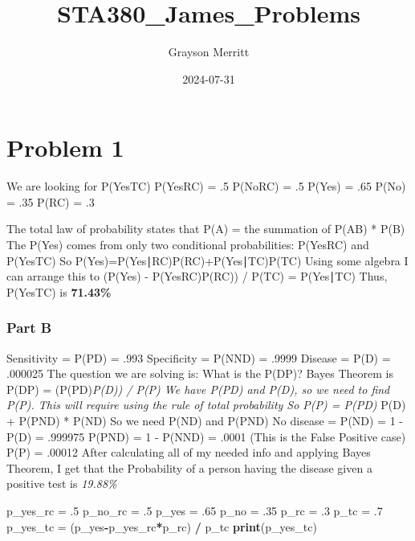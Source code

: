 \documentclass[
]{article}
\title{STA380\_James\_Problems}
\author{Grayson Merritt}
\date{2024-07-31}
\newenvironment{Shaded}{\begin{snugshade}}{\end{snugshade}}
\newcommand{\DecValTok}[1]{\textcolor[rgb]{0.00,0.00,0.81}{#1}}
\newcommand{\FunctionTok}[1]{\textcolor[rgb]{0.13,0.29,0.53}{\textbf{#1}}}
\newcommand{\NormalTok}[1]{#1}
\newcommand{\OtherTok}[1]{\textcolor[rgb]{0.56,0.35,0.01}{#1}}
\newcommand{\SpecialCharTok}[1]{\textcolor[rgb]{0.81,0.36,0.00}{\textbf{#1}}}
\begin{document}
\maketitle

\section{Problem 1}\label{problem-1}

We are looking for P(Yes\textbar TC) P(Yes\textbar RC) = .5
P(No\textbar RC) = .5 P(Yes) = .65 P(No) = .35 P(RC) = .3

The total law of probability states that P(A) = the summation of
P(A\textbar B) * P(B) The P(Yes) comes from only two conditional
probabilities: P(Yes\textbar RC) and P(Yes\textbar TC) So
P(Yes)=P(Yes∣RC)P(RC)+P(Yes∣TC)P(TC) Using some algebra I can arrange
this to (P(Yes) - P(Yes\textbar RC)P(RC)) / P(TC) = P(Yes∣TC) Thus,
P(Yes\textbar TC) is \textbf{71.43\%}

\subsubsection{Part B}\label{part-b}

Sensitivity = P(P\textbar D) = .993 Specificity = P(N\textbar ND) =
.9999 Disease = P(D) = .000025 The question we are solving is: What is
the P(D\textbar P)? Bayes Theorem is P(D\textbar P) =
(P(P\textbar D)\emph{P(D)) / P(P) We have P(P\textbar D) and P(D), so we
need to find P(P). This will require using the rule of total probability
So P(P) = P(P\textbar D) } P(D) + P(P\textbar ND) * P(ND) So we need
P(ND) and P(P\textbar ND) No disease = P(ND) = 1 - P(D) = .999975
P(P\textbar ND) = 1 - P(N\textbar ND) = .0001 (This is the False
Positive case) P(P) = .00012 After calculating all of my needed info and
applying Bayes Theorem, I get that the Probability of a person having
the disease given a positive test is \emph{19.88\%}

\begin{Shaded}
\begin{Highlighting}[]
\NormalTok{p\_yes\_rc }\OtherTok{=}\NormalTok{ .}\DecValTok{5}
\NormalTok{p\_no\_rc }\OtherTok{=}\NormalTok{ .}\DecValTok{5}
\NormalTok{p\_yes }\OtherTok{=}\NormalTok{ .}\DecValTok{65}
\NormalTok{p\_no }\OtherTok{=}\NormalTok{ .}\DecValTok{35}
\NormalTok{p\_rc }\OtherTok{=}\NormalTok{ .}\DecValTok{3}
\NormalTok{p\_tc }\OtherTok{=}\NormalTok{ .}\DecValTok{7}
\NormalTok{p\_yes\_tc }\OtherTok{=}\NormalTok{ (p\_yes}\SpecialCharTok{{-}}\NormalTok{p\_yes\_rc}\SpecialCharTok{*}\NormalTok{p\_rc) }\SpecialCharTok{/}\NormalTok{ p\_tc}
\FunctionTok{print}\NormalTok{(p\_yes\_tc)}
\end{Highlighting}
\end{Shaded}
\end{document}
